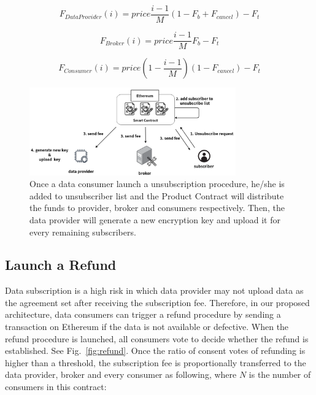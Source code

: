 \documentclass[conference]{IEEEtran}
\begin{document}
\begin{equation}
\label{equation:unsubscribe_provider}
    F_{DataProvider}(i) = price \frac{i-1}{M} (1-F_{b}+F_{cancel}) -F_{t}
\end{equation}

\begin{equation}
\label{equation:unsubscribe_broker}
    F_{Broker}(i) = price \frac{i-1}{M} F_{b} -F_{t}
\end{equation}

\begin{equation}
\label{equation:unsubscribe_consumer}
    F_{Consumer}(i) = price (1-\frac{i-1}{M})(1 -F_{cancel}) -F_{t}
\end{equation}

\begin{figure}[h]
    \centering
    \includegraphics[width=3.5in]{unsubscribe}
    \caption{Once a data consumer launch a unsubscription procedure, he/she is added to unsubscriber list and the Product Contract will distribute the funds to provider, broker and consumers respectively. Then, the data provider will generate a new encryption key and upload it for every remaining subscribers.}
    \label{fig:unsubscribe}
\end{figure}

\subsection{Launch a Refund}
\label{section:refund}
Data subscription is a high risk in which data provider may not upload data as the agreement set after receiving the subscription fee. Therefore, in our proposed architecture, data consumers can trigger a refund procedure by sending a transaction on Ethereum if the data is not available or defective. When the refund procedure is launched, all consumers vote to decide whether the refund is established. See Fig.~\ref{fig:refund}. Once the ratio of consent votes of refunding is higher than a threshold, the subscription fee is proportionally transferred to the data provider, broker and every consumer as following, where $N$ is the number of consumers in this contract:
\end{document}
